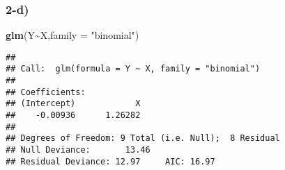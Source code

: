 \documentclass[
]{article}
\newenvironment{Shaded}{\begin{snugshade}}{\end{snugshade}}
\newcommand{\AttributeTok}[1]{\textcolor[rgb]{0.13,0.29,0.53}{#1}}
\newcommand{\FunctionTok}[1]{\textcolor[rgb]{0.13,0.29,0.53}{\textbf{#1}}}
\newcommand{\NormalTok}[1]{#1}
\newcommand{\SpecialCharTok}[1]{\textcolor[rgb]{0.81,0.36,0.00}{\textbf{#1}}}
\newcommand{\StringTok}[1]{\textcolor[rgb]{0.31,0.60,0.02}{#1}}
\begin{document}
\hypertarget{d-2}{%
\subsubsection{2-d)}\label{d-2}}

\begin{Shaded}
\begin{Highlighting}[]
\FunctionTok{glm}\NormalTok{(Y}\SpecialCharTok{\textasciitilde{}}\NormalTok{X,}\AttributeTok{family =} \StringTok{"binomial"}\NormalTok{)}
\end{Highlighting}
\end{Shaded}

\begin{verbatim}
## 
## Call:  glm(formula = Y ~ X, family = "binomial")
## 
## Coefficients:
## (Intercept)            X  
##    -0.00936      1.26282  
## 
## Degrees of Freedom: 9 Total (i.e. Null);  8 Residual
## Null Deviance:       13.46 
## Residual Deviance: 12.97     AIC: 16.97
\end{verbatim}
\end{document}

